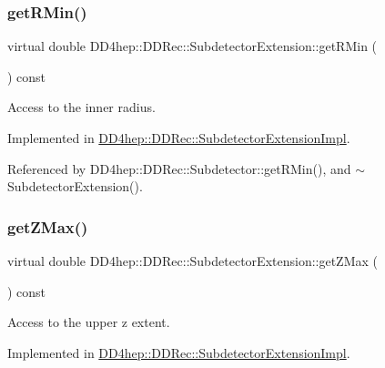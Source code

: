 \subsubsection{\texorpdfstring{get\+R\+Min()}{getRMin()}}
{\footnotesize\ttfamily virtual double D\+D4hep\+::\+D\+D\+Rec\+::\+Subdetector\+Extension\+::get\+R\+Min (\begin{DoxyParamCaption}{ }\end{DoxyParamCaption}) const\hspace{0.3cm}{\ttfamily [pure virtual]}}



Access to the inner radius. 



Implemented in \hyperlink{class_d_d4hep_1_1_d_d_rec_1_1_subdetector_extension_impl_ae7d7465cb600b068d0e2e9b2d80dd831}{D\+D4hep\+::\+D\+D\+Rec\+::\+Subdetector\+Extension\+Impl}.



Referenced by D\+D4hep\+::\+D\+D\+Rec\+::\+Subdetector\+::get\+R\+Min(), and $\sim$\+Subdetector\+Extension().

\hypertarget{class_d_d4hep_1_1_d_d_rec_1_1_subdetector_extension_aea56290179f8271d6a2a3be1658d9b47}{}\label{class_d_d4hep_1_1_d_d_rec_1_1_subdetector_extension_aea56290179f8271d6a2a3be1658d9b47} 
\subsubsection{\texorpdfstring{get\+Z\+Max()}{getZMax()}}
{\footnotesize\ttfamily virtual double D\+D4hep\+::\+D\+D\+Rec\+::\+Subdetector\+Extension\+::get\+Z\+Max (\begin{DoxyParamCaption}{ }\end{DoxyParamCaption}) const\hspace{0.3cm}{\ttfamily [pure virtual]}}



Access to the upper z extent. 



Implemented in \hyperlink{class_d_d4hep_1_1_d_d_rec_1_1_subdetector_extension_impl_af83c23c0ccf18297c07bf3a55cc3b16c}{D\+D4hep\+::\+D\+D\+Rec\+::\+Subdetector\+Extension\+Impl}.



